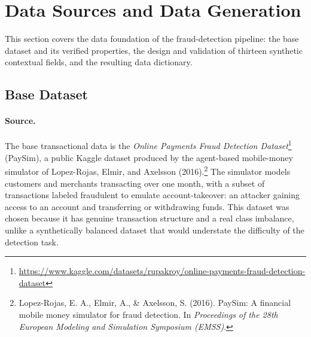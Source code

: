 %

\section{Data Sources and Data Generation}

This section covers the data foundation of the fraud-detection pipeline: the base dataset and its verified properties, the design and validation of thirteen synthetic contextual fields, and the resulting data dictionary.

\subsection{Base Dataset}
\label{subsec:base-dataset}

\paragraph{Source.} The base transactional data is the \emph{Online Payments Fraud Detection Dataset}\footnote{\url{https://www.kaggle.com/datasets/rupakroy/online-payments-fraud-detection-dataset}} (PaySim), a public Kaggle dataset produced by the agent-based mobile-money simulator of Lopez-Rojas, Elmir, and Axelsson (2016).\footnote{Lopez-Rojas, E. A., Elmir, A., \& Axelsson, S. (2016). PaySim: A financial mobile money simulator for fraud detection. In \emph{Proceedings of the 28th European Modeling and Simulation Symposium (EMSS)}.} The simulator models customers and merchants transacting over one month, with a subset of transactions labeled fraudulent to emulate account-takeover: an attacker gaining access to an account and transferring or withdrawing funds. This dataset was chosen because it has genuine transaction structure and a real class imbalance, unlike a synthetically balanced dataset that would understate the difficulty of the detection task.

